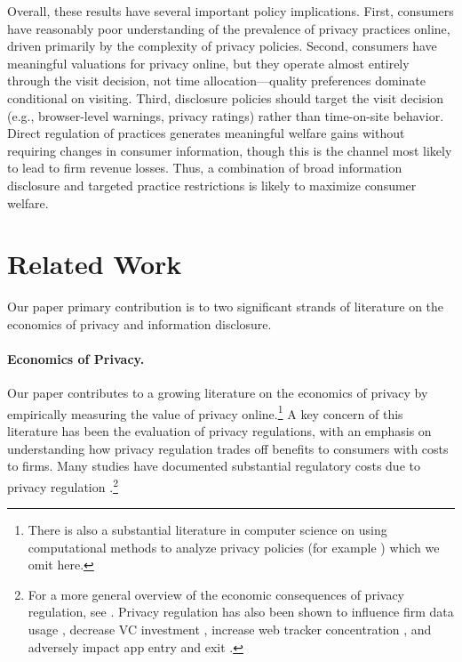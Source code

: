 \documentclass[12pt]{article}
\theoremstyle{definition}
\theoremstyle{remark}
\begin{document}
Overall, these results have several important policy implications. First, consumers have reasonably poor understanding of the prevalence of privacy practices online, driven primarily by the complexity of privacy policies. Second, consumers have meaningful valuations for privacy online, but they operate almost entirely through the visit decision, not time allocation---quality preferences dominate conditional on visiting. Third, disclosure policies should target the visit decision (e.g., browser-level warnings, privacy ratings) rather than time-on-site behavior. Direct regulation of practices generates meaningful welfare gains without requiring changes in consumer information, though this is the channel most likely to lead to firm revenue losses. Thus, a combination of broad information disclosure and targeted practice restrictions is likely to maximize consumer welfare.

\section{Related Work}\label{sec:lit}

Our paper primary contribution is to two significant strands of literature on the economics of privacy and information disclosure.

\paragraph{Economics of Privacy.} Our paper contributes to a growing literature on the economics of privacy \citep{acquisti2016economics, goldfarb2023economics} by empirically measuring the value of privacy online.\footnote{There is also a substantial literature in computer science on using computational methods to analyze privacy policies (for example \citep{amos2021privacy, wagner2022privacy, tang2023policygpt}) which we omit here.} A key concern of this literature has been the evaluation of privacy regulations, with an emphasis on understanding how privacy regulation trades off benefits to consumers with costs to firms. Many studies have documented substantial regulatory costs due to privacy regulation \citep{goldfarb2011privacy, johnson2020consumer, goldberg2023regulating, aridor2023effect, wernerfelt2025estimating, aridor2024privacy, alcobendas2026impact}.\footnote{For a more general overview of the economic consequences of privacy regulation, see \cite{johnson20244}. Privacy regulation has also been shown to influence firm data usage \citep{demirer2024data}, decrease VC investment \citep{jia2021short}, increase web tracker concentration \citep{johnson2023privacy, peukert2022regulatory}, and adversely impact app entry and exit \citep{janssen2022gdpr}.} 
\end{document}

